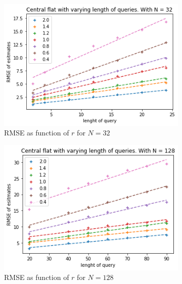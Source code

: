 \documentclass[11pt]{article}
\theoremstyle{definition}
\begin{document}
\begin{figure}[H]
\centering
\begin{subfigure}{.4\textwidth}
  \centering
  \includegraphics[width=\linewidth]{figures/central_flat/varying_r/cen_flat_varying_length_N_linear_=32.png}
  \caption{RMSE as function of $r$ for $N=32$}
  \label{fig:8}
\end{subfigure}%
\begin{subfigure}{.4\textwidth}
  \centering
  \includegraphics[width=\linewidth]{figures/central_flat/varying_r/cen_flat_varying_length_N_linear_=128.png}
  \caption{RMSE as function of $r$ for $N=128$}
  \label{fig:9}
\end{subfigure}
\begin{subfigure}{.4\textwidth}
  \centering

\end{subfigure}
\end{figure}
\end{document}

